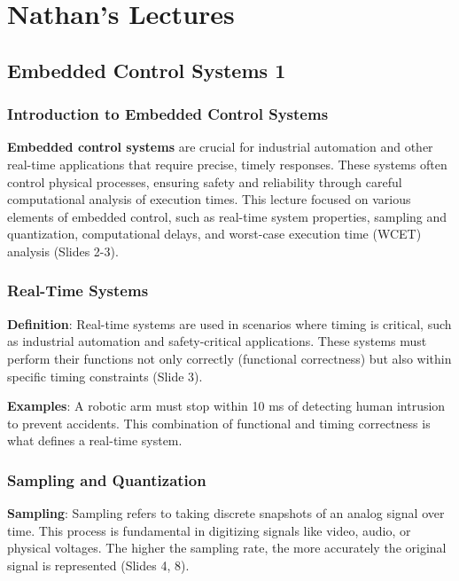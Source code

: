 \documentclass[
  14pt,
  a4paper,
  numbers=noendperiod,
  headinclude=true,
  footinclude=true,
  DIV=calc]{scrreprt}
\begin{document}
\part{Nathan's Lectures}

\chapter{Embedded Control Systems 1}\label{embedded-control-systems-1}

\section{Introduction to Embedded Control
Systems}\label{introduction-to-embedded-control-systems}

\textbf{Embedded control systems} are crucial for industrial automation
and other real-time applications that require precise, timely responses.
These systems often control physical processes, ensuring safety and
reliability through careful computational analysis of execution times.
This lecture focused on various elements of embedded control, such as
real-time system properties, sampling and quantization, computational
delays, and worst-case execution time (WCET) analysis (Slides 2-3).

\section{Real-Time Systems}\label{real-time-systems}

\textbf{Definition}: Real-time systems are used in scenarios where
timing is critical, such as industrial automation and safety-critical
applications. These systems must perform their functions not only
correctly (functional correctness) but also within specific timing
constraints (Slide 3).

\textbf{Examples}: A robotic arm must stop within 10 ms of detecting
human intrusion to prevent accidents. This combination of functional and
timing correctness is what defines a real-time system.

\section{Sampling and Quantization}\label{sampling-and-quantization}

\textbf{Sampling}: Sampling refers to taking discrete snapshots of an
analog signal over time. This process is fundamental in digitizing
signals like video, audio, or physical voltages. The higher the sampling
rate, the more accurately the original signal is represented (Slides 4,
8).
\end{document}
